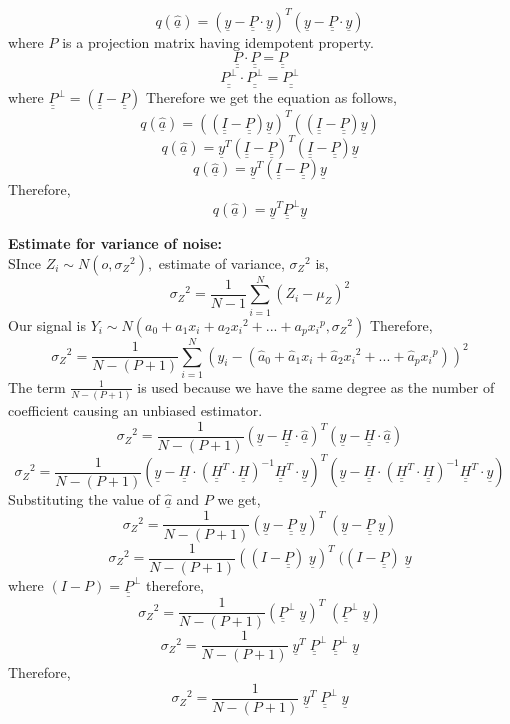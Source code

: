$$q(\underline{\hat{a}}) = (\underline{y} - \underline{\underline{P}}\cdot \underline{y})^T(\underline{y} - \underline{\underline{P}}\cdot \underline{y})$$
\noindent where $P$ is a projection matrix having idempotent property.
$$\underline{\underline{P}}\cdot\underline{\underline{P}} = \underline{\underline{P}}$$
$$\underline{\underline{P^\bot}}\cdot\underline{\underline{P^\bot}} = \underline{\underline{P^\bot}}$$
\noindent where $\underline{\underline{P}}^\bot = (\underline{\underline{I}}-\underline{\underline{P}})$
\noindent Therefore we get the equation as follows,
$$q(\hat{\underline{a}}) = ( (\underline{\underline{I}} - \underline{\underline{P}})\underline{y})^T( (\underline{\underline{I}}-\underline{\underline{P}})\underline{y}) $$ 
$$q(\hat{\underline{a}}) = \underline{y}^T(\underline{\underline{I}} -\underline{\underline{P}})^T(\underline{\underline{I}}-\underline{\underline{P}})\underline{y}$$
$$q(\hat{\underline{a}}) = \underline{y}^T(\underline{\underline{I}}-\underline{\underline{P}})\underline{y}$$
\noindent Therefore,
$$q(\hat{\underline{a}}) = \underline{y}^T\underline{\underline{P}}^\bot \underline{y}$$

\noindent \textbf{Estimate for variance of noise:}\\
\noindent SInce $Z_i \sim N(o, {\sigma_Z}^2),$ estimate of variance, ${\sigma_Z}^2$ is,
$$ {\sigma_Z}^2 = \frac{1}{N-1} \sum_{i=1}^{N}(Z_i - \mu_Z)^2  $$
\noindent Our signal is  $Y_i \sim N( a_0 + a_1 x_i + a_2 {x_i}^2 + ...+ a_p {x_i}^p, {\sigma_Z}^2) $
\noindent Therefore, 
$$ {\sigma_Z}^2 = \frac{1}{N-(P+1)} \sum_{i=1}^{N}(y_i - ( \hat{a}_0 + \hat{a}_1 x_i + \hat{a}_2 {x_i}^2 + ...+ \hat{a}_p {x_i}^p))^2 $$
\noindent The term $ \frac{1}{N-(P+1)}  $ is used because we have the same degree as the number of coefficient causing an unbiased estimator.
$$ {\sigma_Z}^2 = \frac{1}{N-(P+1)}(\underline{y} - \underline{\underline{H}} \cdot \underline{\hat{a}})^T (\underline{y} - \underline{\underline{H}} \cdot \underline{\hat{a}}) $$
$$ {\sigma_Z}^2 = \frac{1}{N-(P+1)}(\underline{y}-\underline{\underline{H}} \cdot (\underline{\underline{H}}^T \cdot \underline{\underline{H}})^{-1}\underline{\underline{H}}^T \cdot \underline{y})^T(\underline{y} -\underline{\underline{H}} \cdot (\underline{\underline{H}}^T\cdot \underline{\underline{H}})^{-1}\underline{\underline{H}}^T\cdot \underline{y}) $$
\noindent Substituting the value of $\underline{\hat{a}}$ and $P$ we get,
$$ {\sigma_Z}^2 = \frac{1}{N-(P+1)}(\underline{y} - \underline{\underline{P}} \;\underline{y})^T \; (\underline{y} - \underline{\underline{P}} \; \underline{y}) $$
$$ {\sigma_Z}^2 = \frac{1}{N-(P+1)}((I - \underline{\underline{P}}) \;\underline{y})^T \; ((I - \underline{\underline{P}}) \; \underline{y} $$
\noindent where $ (I - P) = \underline{\underline{P}}^\bot $ therefore,
$$ {\sigma_Z}^2 = \frac{1}{N-(P+1)}( \underline{\underline{P}}^\bot \;\underline{y})^T \; (\underline{\underline{P}}^\bot \; \underline{y}) $$
$$ {\sigma_Z}^2 = \frac{1}{N-(P+1)} \; \underline{y}^T \; \underline{\underline{P}}^\bot \; \underline{\underline{P}}^\bot \; \underline{y} $$
\noindent Therefore,
$$ {\sigma_Z}^2 = \frac{1}{N-(P+1)} \; \underline{y}^T \; \underline{\underline{P}}^\bot  \; \underline{y} $$

